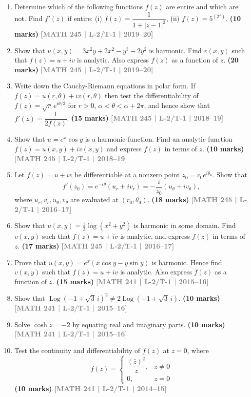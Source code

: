 \documentclass[12pt,a4paper]{article}
\newcommand{\yr}[1]{\hfill\textcolor{gray}{\small\textbf{[#1]}}}
\newcommand{\mk}[1]{\textcolor{orange!70!black}{\small\textbf{(#1 marks)}}}
\begin{document}
\begin{enumerate}
\item Determine which of the following functions $f(z)$ are entire and which are not. Find $f'(z)$ if entire: (i) $f(z)=\dfrac{1}{1+|z-1|^{2}}$, (ii) $f(z)=5^{(2^{z})}$.
\mk{10} \yr{MATH 245 | L-2/T-1 | 2019--20}

\item Show that $u(x,y)=3x^{2}y+2x^{2}-y^{3}-2y^{2}$ is harmonic. Find $v(x,y)$ such that $f(z)=u+iv$ is analytic. Also express $f(z)$ as a function of $z$.
\mk{20} \yr{MATH 245 | L-2/T-1 | 2019--20}

\item Write down the Cauchy-Riemann equations in polar form. If $f(z)=u(r,\theta)+ iv(r,\theta)$ then test the differentiability of $f(z)=\sqrt{r}\,e^{i\theta/2}$ for $r>0$, $\alpha<\theta<\alpha+2\pi$, and hence show that $f'(z)=\dfrac{1}{2f(z)}$.
\mk{15} \yr{MATH 245 | L-2/T-1 | 2018--19}

\item Show that $u=e^{x}\cos y$ is a harmonic function. Find an analytic function $f(z)=u(x,y)+iv(x,y)$ and express $f(z)$ in terms of $z$.
\mk{10} \yr{MATH 245 | L-2/T-1 | 2018--19}

\item Let $f(z)=u+iv$ be differentiable at a nonzero point $z_{0}=r_{0}e^{i\theta_{0}}$. Show that
\[
f'(z_{0})=e^{-i\theta}(u_{r}+iv_{r})=-\frac{i}{z_{0}}(u_{\theta}+iv_{\theta}),
\]
where $u_{r},v_{r},u_{\theta},v_{\theta}$ are evaluated at $(r_{0},\theta_{0})$.
\mk{18} \yr{MATH 245 | L-2/T-1 | 2016--17}

\item Show that $u(x,y)=\tfrac{1}{2}\log(x^{2}+y^{2})$ is harmonic in some domain. Find $v(x,y)$ such that $f(z)=u+iv$ is analytic, and express $f(z)$ in terms of $z$.
\mk{17} \yr{MATH 245 | L-2/T-1 | 2016--17}

\item Prove that $u(x,y)=e^{x}(x\cos y - y\sin y)$ is harmonic. Hence find $v(x,y)$ such that $f(z)=u+iv$ is analytic. Also express $f(z)$ as a function of $z$.
\mk{15} \yr{MATH 241 | L-2/T-1 | 2015--16}

\item Show that $\operatorname{Log}(-1+\sqrt{3}\,i)^{2}\neq 2\operatorname{Log}(-1+\sqrt{3}\,i)$.
\mk{10} \yr{MATH 241 | L-2/T-1 | 2015--16}

\item Solve $\cosh z=-2$ by equating real and imaginary parts.
\mk{10} \yr{MATH 241 | L-2/T-1 | 2015--16}

\item Test the continuity and differentiability of $f(z)$ at $z=0$, where
\[
f(z)=\begin{cases} \dfrac{(\bar{z})^{2}}{z}, & z\neq 0 \\ 0, & z=0 \end{cases}
\]
\mk{10} \yr{MATH 241 | L-2/T-1 | 2014--15}


\end{enumerate}
\end{document}
